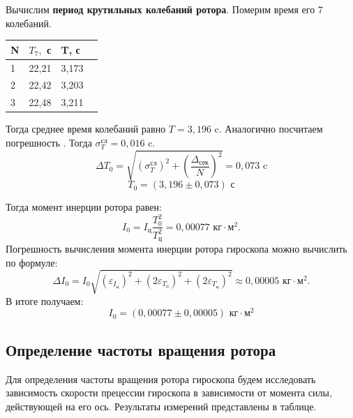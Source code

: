 \documentclass[a4paper,12pt]{article}
\begin{document}
Вычислим \textbf{период крутильных колебаний ротора}. Померим время его 7 колебаний.
\begin{table}[!ht]
    \centering
    \begin{tabular}{|l|l|l|l|}
    \hline
        N & $T_7,$ с & T, с \\ \hline
        1 & 22,21 & 3,173 \\ \hline
        2 & 22,42 & 3,203 \\ \hline
        3 & 22,48 & 3,211 \\ \hline
    \end{tabular}
\end{table}
\par Тогда среднее время колебаний равно $T = 3,196$ c. Аналогично посчитаем погрешность . Тогда $\sigma^{\text{сл}}_T = 0,016$ c.
$$ \Delta T_0 = \sqrt{\left( \sigma^\text{сл}_T \right)^2 + \left(\frac{\Delta_\text{сек}}{N}  \right)^2  } = 0,073 \text{ c}$$
$$ T_0 = \left( 3,196 \pm 0,073\right) \text{ с} $$

Тогда момент инерции ротора равен:
$$I_0=I_\text{ц}\frac{T_0^2}{T_\text{ц}^2} = 0,00077 \text{ кг} \cdot \text{м}^2.$$
Погрешность вычисления момента инерции ротора гироскопа можно вычислить по формуле:
$$\Delta I_0 = I_0\sqrt{\left( \varepsilon_{I_\text{ц}} \right)^2 +\left( 2 \varepsilon_{T_0} \right)^2 + \left(2 \varepsilon_{T_\text{ц}} \right)^2} \approx 0,00005 \text{ кг} \cdot \text{м}^2.$$
В итоге получаем:
$$I_0 = \left( 0,00077 \pm 0,00005 \right) \text{ кг} \cdot \text{м}^2$$


\subsection*{Определение частоты вращения ротора}
Для определения частоты вращения ротора гироскопа будем исследовать зависимость скорости прецессии гироскопа в зависимости от момента силы, действующей на его ось. Результаты измерений представлены в таблице.
\end{document}
